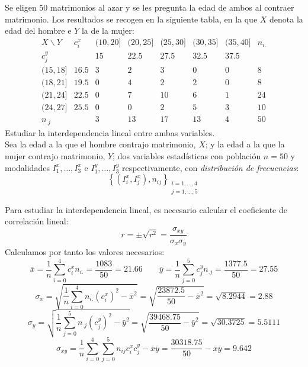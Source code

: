 \begin{ejercicio}
    Se eligen 50 matrimonios al azar y se les pregunta la edad de ambos al contraer matrimonio. Los resultados se recogen en la siguiente tabla, en la que $X$ denota la edad del hombre e $Y$ la de la mujer:
    \begin{equation*}
        \begin{array}{c||c|ccccc|c}
            X\backslash Y & c_i^x & (10, 20] & (20, 25] & (25, 30] & (30, 35] & (35, 40] & n_{i.}\\ \hline \hline
            c_j^y & & 15 & 22.5 & 27.5 & 32.5 & 37.5 &  \\ \hline
            (15, 18] & 16.5&  3 & 2 & 3 & 0 & 0 & 8\\
            (18, 21] & 19.5 & 0 & 4 & 2 & 2 & 0 & 8\\
            (21, 24] & 22.5 &  0 & 7 & 10 & 6 & 1 & 24\\
            (24, 27] & 25.5 &  0 & 0 & 2 & 5 & 3 & 10\\ \hline
            n_{.j} & & 3 & 13 & 17 & 13 & 4 & 50
        \end{array}
    \end{equation*}
    Estudiar la interdependencia lineal entre ambas variables.\\

    Sea la edad a la que el hombre contrajo matrimonio, $X$; y la edad a la que la mujer contrajo matrimonio, $Y$; dos variables estadísticas con población $n=50$ y modalidades $I^x_1, \dots, I^x_3$ e $I^y_1, \dots, I^y_3$ respectivamente, con \emph{distribución de frecuencias}:
        $$\left\{ (I^x_i,I^x_j), n_{ij}\right\}_{\substack{i=1,\dots,4\\j=1,\dots,5}}$$

    Para estudiar la interdependencia lineal, es necesario calcular el coeficiente de correlación lineal:
    \begin{equation*}
        r = \pm \sqrt{r^2} = \frac{\sigma_{xy}}{\sigma_x \sigma_y}
    \end{equation*}
    Calculamos por tanto los valores necesarios:
    \begin{equation*}
        \bar{x} = \frac{1}{n}\sum_{i=0}^4 c_i^x n_{i.} = \frac{1083}{50} = 21.66
        \qquad
        \bar{y} = \frac{1}{n}\sum_{j=0}^5 c_j^y n_{.j} = \frac{1377.5}{50} = 27.55
    \end{equation*}
    \begin{equation*}
        \sigma_x = \sqrt{\frac{1}{n}\sum_{i=0}^4 n_{i.} (c_i^x)^2 - \bar{x}^2}
        = \sqrt{\frac{23872.5}{50} - \bar{x}^2}
        = \sqrt{8.2944} = 2.88
    \end{equation*}
    \begin{equation*}
        \sigma_y = \sqrt{\frac{1}{n}\sum_{j=0}^5 n_{.j} (c_j^y)^2 - \bar{y}^2}
        = \sqrt{\frac{39468.75}{50} - \bar{y}^2}
        = \sqrt{30.3725} = 5.5111
    \end{equation*}
    \begin{equation*}
        \sigma_{xy} = \frac{1}{n} \sum_{i=0}^4 \sum_{j=0}^5 n_{ij}c_i^x c_j^y - \bar{x}\bar{y} = \frac{30318.75}{50} - \bar{x}\bar{y} = 9.642
    \end{equation*}


\end{ejercicio}
